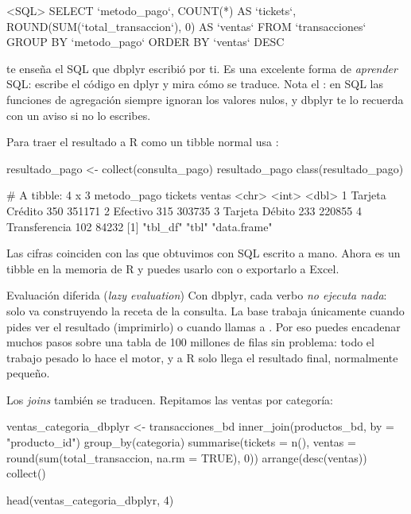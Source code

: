 \begin{rsalida}
<SQL>
SELECT
  `metodo_pago`,
  COUNT(*) AS `tickets`,
  ROUND(SUM(`total_transaccion`), 0) AS `ventas`
FROM `transacciones`
GROUP BY `metodo_pago`
ORDER BY `ventas` DESC
\end{rsalida}

 te enseña el SQL que dbplyr escribió por ti. Es una
excelente forma de \emph{aprender} SQL: escribe el código en dplyr y mira
cómo se traduce. Nota el : en SQL las funciones de
agregación siempre ignoran los valores nulos, y dbplyr te lo recuerda con
un aviso si no lo escribes.

Para traer el resultado a R como un tibble normal usa :

\begin{rcode}
resultado_pago <- collect(consulta_pago)
resultado_pago
class(resultado_pago)
\end{rcode}

\begin{rsalida}
# A tibble: 4 x 3
  metodo_pago     tickets ventas
  <chr>             <int>  <dbl>
1 Tarjeta Crédito     350 351171
2 Efectivo            315 303735
3 Tarjeta Débito      233 220855
4 Transferencia       102  84232
[1] "tbl_df"     "tbl"        "data.frame"
\end{rsalida}

Las cifras coinciden con las que obtuvimos con SQL escrito a mano. Ahora
 es un tibble en la memoria de R y puedes usarlo con
 o exportarlo a Excel.

\begin{concepto}{Evaluación diferida (\emph{lazy evaluation})}
Con dbplyr, cada verbo \emph{no ejecuta nada}: solo va construyendo la
receta de la consulta. La base trabaja únicamente cuando pides ver el
resultado (imprimirlo) o cuando llamas a . Por eso puedes
encadenar muchos pasos sobre una tabla de 100 millones de filas sin
problema: todo el trabajo pesado lo hace el motor, y a R solo llega el
resultado final, normalmente pequeño.
\end{concepto}

Los \emph{joins} también se traducen. Repitamos las ventas por categoría:

\begin{rcode}
ventas_categoria_dbplyr <- transacciones_bd %
  inner_join(productos_bd, by = "producto_id") %
  group_by(categoria) %
  summarise(tickets = n(),
            ventas  = round(sum(total_transaccion, na.rm = TRUE), 0)) %
  arrange(desc(ventas)) %
  collect()

head(ventas_categoria_dbplyr, 4)
\end{rcode}

